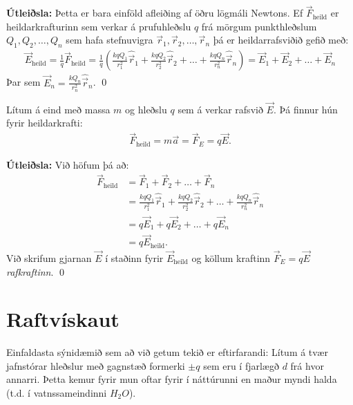 \textbf{Útleiðsla:} Þetta er bara einföld afleiðing af öðru lögmáli Newtons. Ef $\vec{F}_{\text{heild}}$ er heildarkrafturinn sem verkar á prufuhleðslu $q$ frá mörgum punkthleðslum $Q_1, Q_2, \ldots, Q_n$ sem hafa stefnuvigra $\vec{r}_1, \vec{r}_2, \ldots, \vec{r}_n$ þá er heildarrafsviðið gefið með:
\begin{align*}
    \vec{E}_{\text{heild}} = \frac{1}{q} \vec{F}_{\text{heild}} = \frac{1}{q}\left( \frac{kqQ_1}{r_1^2} \hat{\vec{r}}_1 + \frac{kqQ_2}{r_2^2} \hat{\vec{r}}_2 + \ldots + \frac{kqQ_n}{r_n^2} \hat{\vec{r}}_n \right) = \vec{E}_1 + \vec{E}_2 + \ldots + \vec{E}_n
\end{align*}
Þar sem $\vec{E}_n = \frac{kQ_n}{r_n^2} \hat{\vec{r}}_n$. \qed



\begin{tcolorbox}
\begin{theorem}
Lítum á eind með massa $m$ og hleðslu $q$ sem á verkar rafsvið $\vec{E}$. Þá finnur hún fyrir heildarkrafti:
\begin{align*}
    \vec{F}_{\text{heild}} = m\vec{a} = \vec{F}_{E} = q\vec{E}.
\end{align*}
\end{theorem}
\end{tcolorbox}

\textbf{Útleiðsla:} Við höfum þá að:
\begin{align*}
    \vec{F}_{\text{heild}} &= \vec{F}_1 + \vec{F}_2 + \ldots + \vec{F}_n \\
    &= \frac{kqQ_1}{r_1^2} \hat{\vec{r}}_1 + \frac{kqQ_2}{r_2^2} \hat{\vec{r}}_2 + \ldots + \frac{kqQ_n}{r_n^2} \hat{\vec{r}}_n \\
    &= q\vec{E}_1 + q\vec{E}_2 + \ldots + q \vec{E}_n \\
    &= q \vec{E}_{\text{heild}}.
\end{align*}
Við skrifum gjarnan $\vec{E}$ í staðinn fyrir $\vec{E}_{\text{heild}}$ og köllum kraftinn $\vec{F}_E = q\vec{E}$ \emph{rafkraftinn}. \qed



\section{Raftvískaut}

Einfaldasta sýnidæmið sem að við getum tekið er eftirfarandi: Lítum á tvær jafnstórar hleðslur með gagnstæð formerki $\pm q$ sem eru í fjarlægð $d$ frá hvor annarri. Þetta kemur fyrir mun oftar fyrir í náttúrunni en maður myndi halda (t.d. í vatnssameindinni $H_2 O$). 

